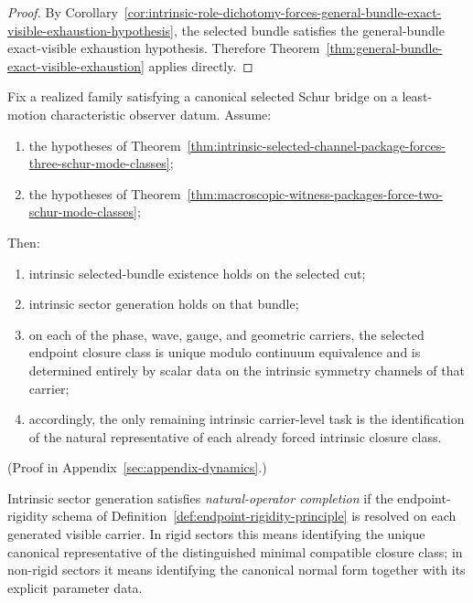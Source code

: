 \begin{proof}
By
Corollary~\ref{cor:intrinsic-role-dichotomy-forces-general-bundle-exact-visible-exhaustion-hypothesis},
the selected bundle satisfies the general-bundle exact-visible exhaustion
hypothesis. Therefore
Theorem~\ref{thm:general-bundle-exact-visible-exhaustion} applies directly.
\end{proof}

\begin{theorem}
\label{thm:single-witness-intrinsic-flagship-forcing}
Fix a realized family satisfying a canonical selected Schur bridge on a
least-motion characteristic observer datum. Assume:
\begin{enumerate}[label=(\roman*), leftmargin=2em, itemsep=0.2em]
\item the hypotheses of
      Theorem~\ref{thm:intrinsic-selected-channel-package-forces-three-schur-mode-classes};
\item the hypotheses of
      Theorem~\ref{thm:macroscopic-witness-packages-force-two-schur-mode-classes};
\end{enumerate}
Then:
\begin{enumerate}[label=(\alph*), leftmargin=2em, itemsep=0.2em]
\item intrinsic selected-bundle existence holds on the selected cut;
\item intrinsic sector generation holds on that bundle;
\item on each of the phase, wave, gauge, and geometric carriers, the selected
      endpoint closure class is unique modulo continuum equivalence and is
      determined entirely by scalar data on the intrinsic symmetry channels of
      that carrier;
\item accordingly, the only remaining intrinsic carrier-level task is the
      identification of the natural representative of each already forced
      intrinsic closure class.
\end{enumerate}
\end{theorem}

(Proof in Appendix~\ref{sec:appendix-dynamics}.)

\begin{definition}
\label{def:natural-operator-completion}
Intrinsic sector generation satisfies \emph{natural-operator completion} if the
endpoint-rigidity schema of
Definition~\ref{def:endpoint-rigidity-principle} is resolved on each generated
visible carrier. In rigid sectors this means identifying the unique canonical
representative of the distinguished minimal compatible closure class; in
non-rigid sectors it means identifying the canonical normal form together with
its explicit parameter data.
\end{definition}

